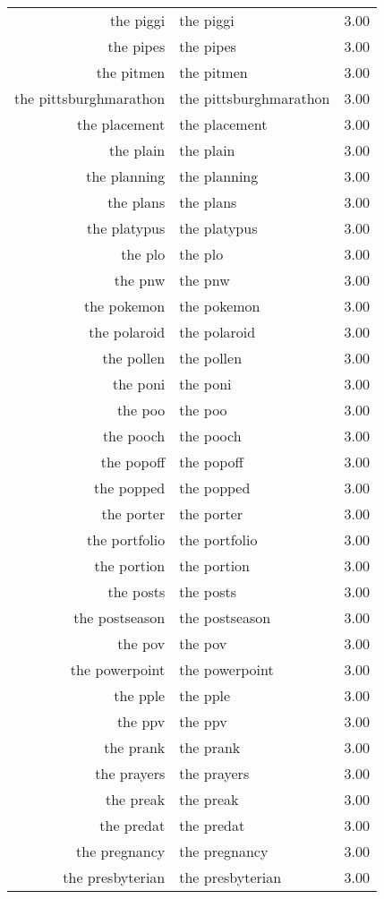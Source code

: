 \begin{table}[ht]
\begin{tabular}{rlr}
  the piggi & the piggi & 3.00 \\ 
  the pipes & the pipes & 3.00 \\ 
  the pitmen & the pitmen & 3.00 \\ 
  the pittsburghmarathon & the pittsburghmarathon & 3.00 \\ 
  the placement & the placement & 3.00 \\ 
  the plain & the plain & 3.00 \\ 
  the planning & the planning & 3.00 \\ 
  the plans & the plans & 3.00 \\ 
  the platypus & the platypus & 3.00 \\ 
  the plo & the plo & 3.00 \\ 
  the pnw & the pnw & 3.00 \\ 
  the pokemon & the pokemon & 3.00 \\ 
  the polaroid & the polaroid & 3.00 \\ 
  the pollen & the pollen & 3.00 \\ 
  the poni & the poni & 3.00 \\ 
  the poo & the poo & 3.00 \\ 
  the pooch & the pooch & 3.00 \\ 
  the popoff & the popoff & 3.00 \\ 
  the popped & the popped & 3.00 \\ 
  the porter & the porter & 3.00 \\ 
  the portfolio & the portfolio & 3.00 \\ 
  the portion & the portion & 3.00 \\ 
  the posts & the posts & 3.00 \\ 
  the postseason & the postseason & 3.00 \\ 
  the pov & the pov & 3.00 \\ 
  the powerpoint & the powerpoint & 3.00 \\ 
  the pple & the pple & 3.00 \\ 
  the ppv & the ppv & 3.00 \\ 
  the prank & the prank & 3.00 \\ 
  the prayers & the prayers & 3.00 \\ 
  the preak & the preak & 3.00 \\ 
  the predat & the predat & 3.00 \\ 
  the pregnancy & the pregnancy & 3.00 \\ 
  the presbyterian & the presbyterian & 3.00 \\ 

\end{tabular}
\end{table}
